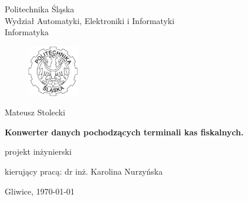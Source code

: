 


\pagestyle{empty}
\sffamily

\noindent
\begin{center}
    \Large
    Politechnika Śląska\\
    Wydział Automatyki, Elektroniki i Informatyki
    \\ Informatyka
\end{center}

\begin{figure}[h]
\begin{center}
\includegraphics[width=0.2\textwidth]{img/polsl.pdf}
\end{center}
\end{figure}

\vfill\vfill
\begin{center}
    \Large
    Mateusz Stolecki
\end{center}

\vfill
\begin{center}
    \Huge\bfseries
    Konwerter danych pochodzących terminali kas fiskalnych.
\end{center}

\vfill
\begin{center}
    \Large
    projekt inżynierski
\end{center}

\vfill\vfill\vfill
\begin{center}
    \Large
    kierujący pracą: dr inż. Karolina Nurzyńska
\end{center}

\vfill
\begin{center}
\large
   Gliwice, \today
\end{center}

\cleardoublepage


\rmfamily
\normalfont

\pagestyle{headings}
\tableofcontents



